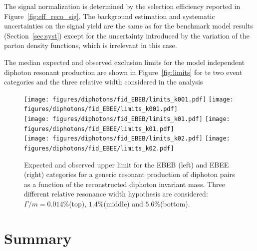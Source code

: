 The signal normalization is determined by the selection efficiency reported in Figure~\ref{fig:eff_reco_sig}.
The background estimation and systematic uncertainties on the signal yield are the same as for the benchmark model
results (Section~\ref{sec:syst}) except for the uncertainty introduced by the variation of the parton density functions, which
is irrelevant in this case.

The median expected and observed exclusion limits for the model independent diphoton resonant production 
are shown in Figure~\ref{fig:limits} for te two event categories and the three relative width considered in the analysis

\begin{figure}[h!]
  \centering
  \texttt{[image: figures/diphotons/fid\_EBEB/limits\_k001.pdf]}
  \texttt{[image: figures/diphotons/fid\_EBEE/limits\_k001.pdf]}\\
  \texttt{[image: figures/diphotons/fid\_EBEB/limits\_k01.pdf]}
  \texttt{[image: figures/diphotons/fid\_EBEE/limits\_k01.pdf]}\\
  \texttt{[image: figures/diphotons/fid\_EBEB/limits\_k02.pdf]}
  \texttt{[image: figures/diphotons/fid\_EBEE/limits\_k02.pdf]}\\
    \caption{
      Expected and observed upper limit for the EBEB (left) and EBEE (right) categories for a generic
      resonant production of diphoton pairs as a function of the reconstructed diphoton invariant mass.
      Three different relative resonance width hypothesis are considered: $\Gamma/m = 0.014\%$(top), $1.4\%$(middle) and $5.6\%$(bottom).
    }
    \label{fig:fiducial_limits}
\end{figure}

\section{Summary}
\label{sec:dipho_summary}

